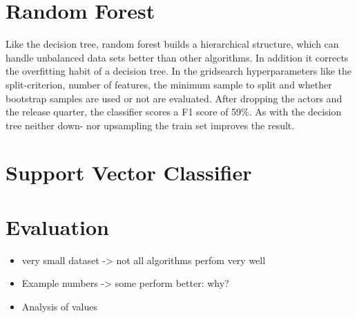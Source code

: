 \section{Random Forest}
Like the decision tree, random forest builds  a hierarchical structure, which can handle unbalanced data sets better than other algorithms. In addition it corrects the overfitting habit of a decision tree. In the gridsearch hyperparameters like the split-criterion, number of features, the minimum sample to split and whether bootstrap samples are used or not are evaluated. After dropping the actors and the release quarter, the classifier scores a F1 score of 59\%. As with the decision tree neither down- nor upsampling the train set improves the result.

\section{Support Vector Classifier}
\section{Evaluation}
\begin{itemize}
	\item very small dataset -> not all algorithms perfom very well
	\item Example numbers -> some perform better: why? 
	\item Analysis of values
\end{itemize}


